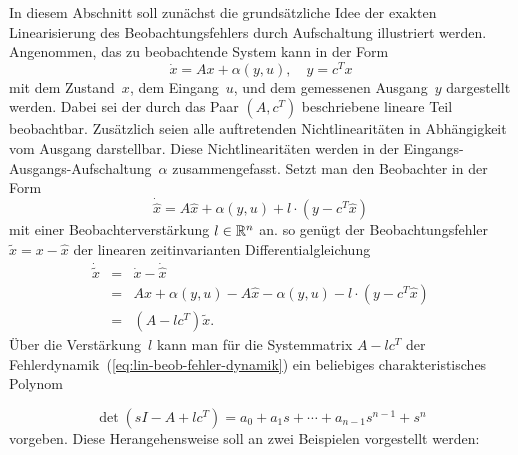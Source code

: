 In diesem Abschnitt soll zunächst die grundsätzliche Idee der exakten
Linearisierung des Beobachtungsfehlers durch Aufschaltung illustriert
werden. Angenommen, das zu beobachtende System kann in der Form
\begin{equation}
\dot{x}=Ax+\alpha(y,u),\quad y=c^{T}x\label{eq:lin-beob-fehler-strecke}
\end{equation}
mit dem Zustand~$x$, dem Eingang~$u$, und dem gemessenen Ausgang~$y$
dargestellt werden. Dabei sei der durch das Paar $(A,c^{T})$ beschriebene
lineare Teil beobachtbar. Zusätzlich seien alle auftretenden Nichtlinearitäten
in Abhängigkeit vom Ausgang darstellbar. Diese Nichtlinearitäten werden
in der Eingangs-Ausgangs-Aufschaltung~$\alpha$ zusammengefasst.
Setzt man den Beobachter in der Form
\begin{equation}
\dot{\hat{x}}=A\hat{x}+\alpha(y,u)+l\cdot\left(y-c^{T}\hat{x}\right)\label{eq:lin-beob-fehler-beobachter}
\end{equation}
mit einer Beobachterverstärkung $l\in{\mathbb{R}}^{n}$ an. so genügt der Beobachtungsfehler
$\tilde{x}=x-\hat{x}$ der linearen zeitinvarianten Differentialgleichung
\begin{equation}
\begin{array}{lcl}
\dot{\tilde{x}} & = & \dot{x}-\dot{\hat{x}}\\
 & = & Ax+\alpha(y,u)-A\hat{x}-\alpha(y,u)-l\cdot\left(y-c^{T}\hat{x}\right)\\
 & = & \left(A-lc^{T}\right)\tilde{x}.
\end{array}\label{eq:lin-beob-fehler-dynamik}
\end{equation}
Über die Verstärkung~$l$ kann man für die Systemmatrix $A-lc^{T}$
der Fehlerdynamik~(\ref{eq:lin-beob-fehler-dynamik}) ein beliebiges
charakteristisches Polynom

\begin{equation}
\det(sI-A+lc^{T})=a_{0}+a_{1}s+\cdots+a_{n-1}s^{n-1}+s^{n}\label{eq:cp}
\end{equation}
vorgeben. Diese Herangehensweise soll an zwei Beispielen vorgestellt
werden:


